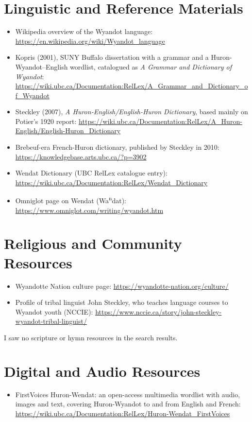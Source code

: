 \documentclass[12pt]{article}
\begin{document}
\section{Linguistic and Reference Materials}
\begin{itemize}
\item Wikipedia overview of the Wyandot language: \url{https://en.wikipedia.org/wiki/Wyandot_language}
\item Kopris (2001), SUNY Buffalo dissertation with a grammar and a Huron-Wyandot--English wordlist, catalogued as \emph{A Grammar and Dictionary of Wyandot}: \url{https://wiki.ubc.ca/Documentation:RelLex/A_Grammar_and_Dictionary_of_Wyandot}
\item Steckley (2007), \emph{A Huron-English/English-Huron Dictionary}, based mainly on Potier's 1920 report: \url{https://wiki.ubc.ca/Documentation:RelLex/A_Huron-English/English-Huron_Dictionary}
\item Brebeuf-era French-Huron dictionary, published by Steckley in 2010: \url{https://knowledgebase.arts.ubc.ca/?p=3902}
\item Wendat Dictionary (UBC RelLex catalogue entry): \url{https://wiki.ubc.ca/Documentation:RelLex/Wendat_Dictionary}
\item Omniglot page on Wendat (Wa\textsuperscript{n}dat): \url{https://www.omniglot.com/writing/wyandot.htm}
\end{itemize}

\section{Religious and Community Resources}
\begin{itemize}
\item Wyandotte Nation culture page: \url{https://wyandotte-nation.org/culture/}
\item Profile of tribal linguist John Steckley, who teaches language courses to Wyandot youth (NCCIE): \url{https://www.nccie.ca/story/john-steckley-wyandot-tribal-linguist/}
\end{itemize}
I saw no scripture or hymn resources in the search results.

\section{Digital and Audio Resources}
\begin{itemize}
\item FirstVoices Huron-Wendat: an open-access multimedia wordlist with audio, images and text, covering Huron-Wyandot to and from English and French: \url{https://wiki.ubc.ca/Documentation:RelLex/Huron-Wendat_FirstVoices}
\end{itemize}
\end{document}
